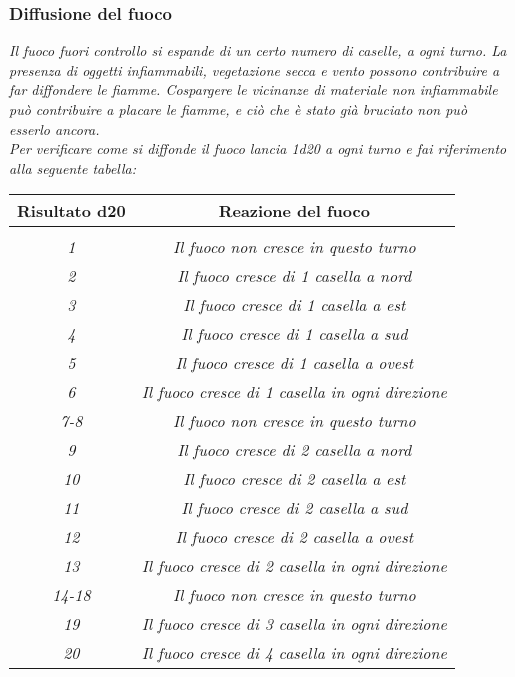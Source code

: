 				\subsubsection{Diffusione del fuoco}
					\emph{Il fuoco fuori controllo si espande di un certo numero di caselle, a ogni turno. La presenza di oggetti infiammabili, vegetazione secca e vento possono contribuire a far diffondere le fiamme. Cospargere le vicinanze di materiale non infiammabile può contribuire a placare le fiamme, e ciò che è stato già bruciato non può esserlo ancora.\\
					Per verificare come si diffonde il fuoco lancia \textit{1d20} a ogni turno e fai riferimento alla seguente tabella:}\\
					\begin{table}[h!]
						\begin{center}
							\label{tab:table2}
							\begin{tabular}{cc}
								\textbf{Risultato d20} & \textbf{Reazione del fuoco}\\
								\hline\\
								\textit{1} & \textit{Il fuoco non cresce in questo turno}\\
								\textit{2} & \textit{Il fuoco cresce di 1 casella a nord}\\
								\textit{3} & \textit{Il fuoco cresce di 1 casella a est}\\
								\textit{4} & \textit{Il fuoco cresce di 1 casella a sud}\\
								\textit{5} & \textit{Il fuoco cresce di 1 casella a ovest}\\
								\textit{6} & \textit{Il fuoco cresce di 1 casella in ogni direzione}\\
								\textit{7-8} & \textit{Il fuoco non cresce in questo turno}\\
								\textit{9} & \textit{Il fuoco cresce di 2 casella a nord}\\
								\textit{10} & \textit{Il fuoco cresce di 2 casella a est}\\
								\textit{11} & \textit{Il fuoco cresce di 2 casella a sud}\\
								\textit{12} & \textit{Il fuoco cresce di 2 casella a ovest}\\
								\textit{13} & \textit{Il fuoco cresce di 2 casella in ogni direzione}\\
								\textit{14-18} & \textit{Il fuoco non cresce in questo turno}\\
								\textit{19} & \textit{Il fuoco cresce di 3 casella in ogni direzione}\\
								\textit{20} & \textit{Il fuoco cresce di 4 casella in ogni direzione}\\
							\end{tabular}
						\end{center}
					\end{table}
